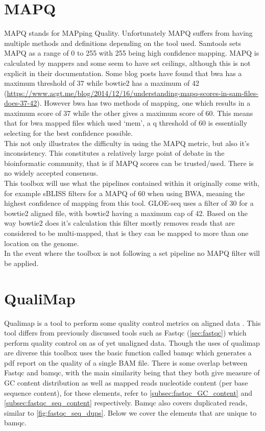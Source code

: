 \section{MAPQ\label{sec:MAPQ}}
MAPQ stands for MAPping Quality. Unfortunately MAPQ suffers from having multiple methods and definitions depending on the tool used. Samtools sets MAPQ as a range of 0 to 255 with 255 being high confidence mapping. MAPQ is calculated by mappers and some seem to have set ceilings, although this is not explicit in their documentation. Some blog posts have found that bwa has a maximum threshold of 37 while bowtie2 has a maximum of 42 (\url{https://www.acgt.me/blog/2014/12/16/understanding-mapq-scores-in-sam-files-does-37-42}). However bwa has two methods of mapping, one which results in a maximum score of 37 while the other gives a maximum score of 60. This means that for bwa mapped files which used `mem', a q threshold of 60 is essentially selecting for the best confidence possible.\\
This not only illustrates the difficulty in using the MAPQ metric, but also it's inconsistency. This constitutes a relatively large point of debate in the bioinformatic community, that is if MAPQ scores can be trusted/used. There is no widely accepted consensus.\\
This toolbox will use what the pipelines contained within it originally come with, for example sBLISS filters for a MAPQ of 60 when using BWA, meaning the highest confidence of mapping from this tool. GLOE-seq uses a filter of 30 for a bowtie2 aligned file, with bowtie2 having a maximum cap of 42. Based on the way bowtie2 does it's calculation this filter mostly removes reads that are considered to be multi-mapped, that is they can be mapped to more than one location on the genome.\\
In the event where the toolbox is not following a set pipeline no MAPQ filter will be applied. 

\section{QualiMap \label{sec:qualimap}}
Qualimap is a tool to perform some quality control metrics on aligned data \cite{qualimap,qualimap2}. This tool differs from previously discussed tools such as Fastqc (\autoref{sec:fastqc}) which perform quality control on as of yet unaligned data. Though the uses of qualimap are diverse this toolbox uses the basic function called bamqc which generates a pdf report on the quality of a single BAM file. There is some overlap between Fastqc and bamqc, with the main similarity being that they both give measure of GC content distribution as well as mapped reads nucleotide content (per base sequence content), for these elements, refer to \autoref{subsec:fastqc_GC_content} and \autoref{subsec:fastqc_seq_content} respectively. Bamqc also covers duplicated reads, similar to \autoref{fig:fastqc_seq_dups}. Below we cover the elements that are unique to bamqc.\\

